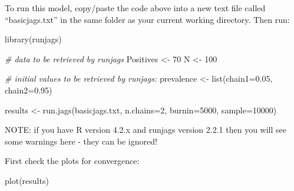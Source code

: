 \documentclass[
  ignorenonframetext,
  aspectratio=169,
]{beamer}
\newenvironment{Shaded}{\begin{snugshade}}{\end{snugshade}}
\newcommand{\AttributeTok}[1]{\textcolor[rgb]{0.77,0.63,0.00}{#1}}
\newcommand{\CommentTok}[1]{\textcolor[rgb]{0.56,0.35,0.01}{\textit{#1}}}
\newcommand{\DecValTok}[1]{\textcolor[rgb]{0.00,0.00,0.81}{#1}}
\newcommand{\FloatTok}[1]{\textcolor[rgb]{0.00,0.00,0.81}{#1}}
\newcommand{\FunctionTok}[1]{\textcolor[rgb]{0.00,0.00,0.00}{#1}}
\newcommand{\NormalTok}[1]{#1}
\newcommand{\OtherTok}[1]{\textcolor[rgb]{0.56,0.35,0.01}{#1}}
\newcommand{\StringTok}[1]{\textcolor[rgb]{0.31,0.60,0.02}{#1}}
\begin{document}
\begin{frame}[fragile]
To run this model, copy/paste the code above into a new text file called
``basicjags.txt'' in the same folder as your current working directory.
Then run:

\scriptsize

\begin{Shaded}
\begin{Highlighting}[]
\FunctionTok{library}\NormalTok{(}\StringTok{\textquotesingle{}runjags\textquotesingle{}}\NormalTok{)}

\CommentTok{\# data to be retrieved by runjags}
\NormalTok{Positives }\OtherTok{\textless{}{-}} \DecValTok{70}
\NormalTok{N }\OtherTok{\textless{}{-}} \DecValTok{100}

\CommentTok{\# initial values to be retrieved by runjags:}
\NormalTok{prevalence }\OtherTok{\textless{}{-}} \FunctionTok{list}\NormalTok{(}\AttributeTok{chain1=}\FloatTok{0.05}\NormalTok{, }\AttributeTok{chain2=}\FloatTok{0.95}\NormalTok{)}
\end{Highlighting}
\end{Shaded}

\normalsize

\scriptsize

\begin{Shaded}
\begin{Highlighting}[]
\NormalTok{results }\OtherTok{\textless{}{-}} \FunctionTok{run.jags}\NormalTok{(}\StringTok{\textquotesingle{}basicjags.txt\textquotesingle{}}\NormalTok{, }\AttributeTok{n.chains=}\DecValTok{2}\NormalTok{, }\AttributeTok{burnin=}\DecValTok{5000}\NormalTok{, }\AttributeTok{sample=}\DecValTok{10000}\NormalTok{)}
\end{Highlighting}
\end{Shaded}

\normalsize

\pause

NOTE: if you have R version 4.2.x and runjags version 2.2.1 then you
will see some warnings here - they can be ignored!

First check the plots for convergence:

\scriptsize

\begin{Shaded}
\begin{Highlighting}[]
\FunctionTok{plot}\NormalTok{(results)}
\end{Highlighting}
\end{Shaded}

\normalsize
\end{frame}
\end{document}
